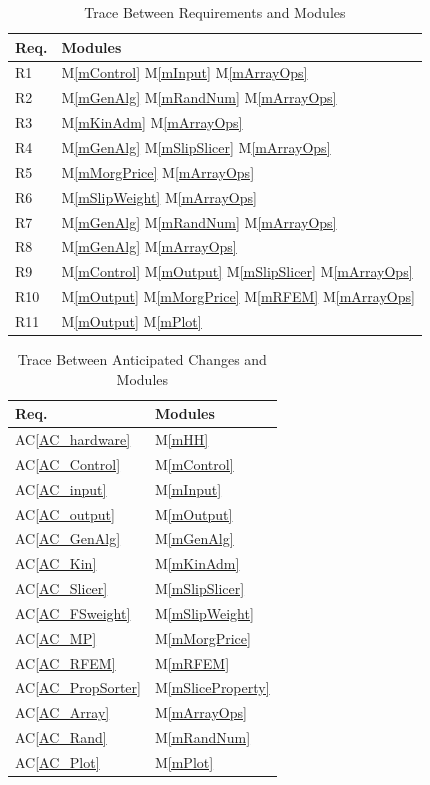 \documentclass[12pt]{article}
\newcommand{\acref}[1]{AC\ref{#1}}
\newcommand{\mref}[1]{M\ref{#1}}
\newcounter{tablenum}
\begin{document}
\begin{table}[h!]
 \label{Table:Req}
\centering
\begin{tabular}{ll}
\toprule
\textbf{Req.} & \textbf{Modules}\\
\midrule
R1 & \mref{mControl} \mref{mInput} \mref{mArrayOps}\\
R2 & \mref{mGenAlg} \mref{mRandNum} \mref{mArrayOps}\\
R3 & \mref{mKinAdm} \mref{mArrayOps}\\
R4 & \mref{mGenAlg} \mref{mSlipSlicer} \mref{mArrayOps}\\
R5 & \mref{mMorgPrice} \mref{mArrayOps}\\
R6 & \mref{mSlipWeight} \mref{mArrayOps}\\
R7 & \mref{mGenAlg} \mref{mRandNum} \mref{mArrayOps}\\
R8 & \mref{mGenAlg} \mref{mArrayOps}\\
R9 & \mref{mControl} \mref{mOutput} \mref{mSlipSlicer} \mref{mArrayOps}\\
R10 & \mref{mOutput} \mref{mMorgPrice} \mref{mRFEM} \mref{mArrayOps}\\
R11 & \mref{mOutput} \mref{mPlot}\\
\bottomrule
\end{tabular}
\caption{Trace Between Requirements and Modules}
\end{table}


\begin{table}[h!]
 \label{Table:AC}
\centering
\begin{tabular}{ll}
\toprule
\textbf{Req.} & \textbf{Modules}\\
\midrule
\acref{AC_hardware} & \mref{mHH}\\
\acref{AC_Control} & \mref{mControl}\\
\acref{AC_input} & \mref{mInput}\\
\acref{AC_output}& \mref{mOutput}\\
\acref{AC_GenAlg}& \mref{mGenAlg}\\
\acref{AC_Kin}& \mref{mKinAdm}\\
\acref{AC_Slicer} & \mref{mSlipSlicer}\\
\acref{AC_FSweight}& \mref{mSlipWeight}\\
\acref{AC_MP} & \mref{mMorgPrice}\\
\acref{AC_RFEM} & \mref{mRFEM}\\
\acref{AC_PropSorter}& \mref{mSliceProperty}\\
\acref{AC_Array} & \mref{mArrayOps}\\
\acref{AC_Rand} & \mref{mRandNum}\\
\acref{AC_Plot} & \mref{mPlot}\\
\bottomrule
\end{tabular}
\caption{Trace Between Anticipated Changes and Modules}
\end{table}
\end{document}
